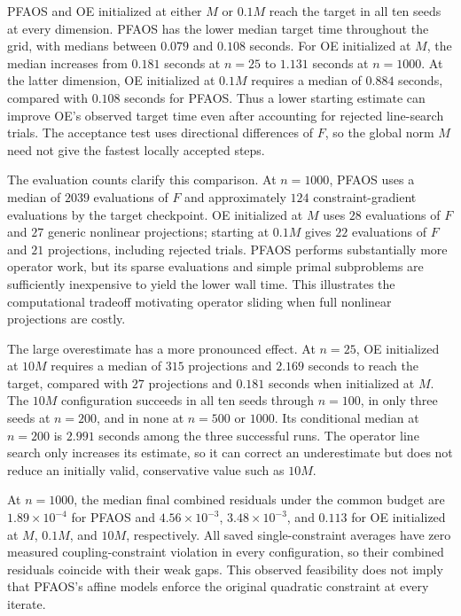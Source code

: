 


PFAOS and OE initialized at either $M$ or $0.1M$ reach the target in
all ten seeds at every dimension. PFAOS has the lower median target time
throughout the grid, with medians between $0.079$ and $0.108$ seconds.
For OE initialized at $M$, the median increases from $0.181$ seconds at
$n=25$ to $1.131$ seconds at $n=1000$. At the latter dimension, OE
initialized at $0.1M$ requires a median of $0.884$ seconds, compared with
$0.108$ seconds for PFAOS. Thus a lower starting estimate can improve OE's
observed target time even after accounting for rejected line-search trials.
The acceptance test uses directional differences of $F$, so the global norm
$M$ need not give the fastest locally accepted steps.

The evaluation counts clarify this comparison. At $n=1000$, PFAOS uses
a median of $2039$ evaluations of $F$ and approximately $124$
constraint-gradient evaluations by the target checkpoint. OE initialized
at $M$ uses $28$ evaluations of $F$ and $27$ generic nonlinear projections;
starting at $0.1M$ gives $22$ evaluations of $F$ and $21$ projections,
including rejected trials. PFAOS performs substantially more operator work,
but its sparse evaluations and simple primal subproblems are sufficiently
inexpensive to yield the lower wall time. This illustrates the computational
tradeoff motivating operator sliding when full nonlinear projections are
costly.

The large overestimate has a more pronounced effect. At $n=25$, OE
initialized at $10M$ requires a median of $315$ projections and $2.169$
seconds to reach the target, compared with $27$ projections and $0.181$
seconds when initialized at $M$. The $10M$ configuration succeeds in all
ten seeds through $n=100$, in only three seeds at $n=200$, and in none
at $n=500$ or $1000$. Its conditional median at $n=200$ is $2.991$
seconds among the three successful runs. The operator line search only
increases its estimate, so it can correct an underestimate but does not
reduce an initially valid, conservative value such as $10M$.

At $n=1000$, the median final combined residuals under the common budget
are $1.89\times10^{-4}$ for PFAOS and $4.56\times10^{-3}$,
$3.48\times10^{-3}$, and $0.113$ for OE initialized at $M$, $0.1M$,
and $10M$, respectively. All saved single-constraint averages have zero
measured coupling-constraint violation in every configuration, so their
combined residuals coincide with their weak gaps. This observed feasibility
does not imply that PFAOS's affine models enforce the original quadratic
constraint at every iterate.

